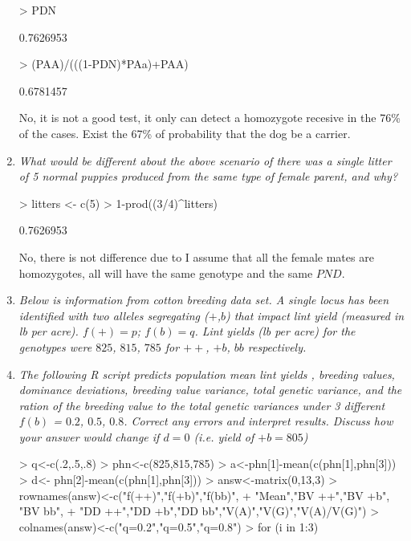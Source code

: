 \documentclass[12pt,a4paper]{paper}
\begin{document}
\begin{enumerate}
\begin{Schunk}
\begin{Sinput}
> PDN
\end{Sinput}
\begin{Soutput}
[1] 0.7626953
\end{Soutput}
\begin{Sinput}
> (PAA)/(((1-PDN)*PAa)+PAA)
\end{Sinput}
\begin{Soutput}
[1] 0.6781457
\end{Soutput}
\end{Schunk}
No, it is not a good test, it only can detect a homozygote recesive in the 76\% of the cases. Exist the 67\% of probability that the dog be a carrier.
\item \emph{What would be different about the above scenario of there was a single litter of 5 normal puppies produced from the same type of female parent, and why?}
\begin{Schunk}
\begin{Sinput}
> litters <- c(5)
> 1-prod((3/4)^litters)
\end{Sinput}
\begin{Soutput}
[1] 0.7626953
\end{Soutput}
\end{Schunk}
No, there is not difference due to I assume that all the female mates are homozygotes, all will have the same genotype and the same $PND$.
\item[] \emph{Below is information from cotton breeding data set. A single locus has been identified with two alleles segregating ($+$,$b$) that impact lint yield (measured in lb per acre). $f(+)=p$; $f(b)=q$. Lint yields (lb per acre) for the genotypes were $825$, $815$, $785$ for $++$, $+b$, $bb$ respectively.}
\item \emph{The following R script predicts population mean lint yields , breeding values, dominance deviations, breeding value variance, total genetic variance, and the ration of the breeding value to the total genetic variances under 3 different $f(b)$ = $0.2$, $0.5$, $0.8$. Correct any errors and interpret results. Discuss how your answer would change if $d=0$ (i.e. yield of $+b = 805$)}
\begin{Schunk}
\begin{Sinput}
> q<-c(.2,.5,.8)
> phn<-c(825,815,785)
> a<-phn[1]-mean(c(phn[1],phn[3]))
> d<- phn[2]-mean(c(phn[1],phn[3]))
> answ<-matrix(0,13,3)
> rownames(answ)<-c("f(++)","f(+b)","f(bb)",
+ 			"Mean","BV ++","BV +b", "BV bb",
+ 			"DD ++","DD +b","DD bb","V(A)","V(G)","V(A)/V(G)")
> colnames(answ)<-c("q=0.2","q=0.5","q=0.8")
> for (i in 1:3){
}
\end{Sinput}
\end{Schunk}
\end{enumerate}
\end{document}
